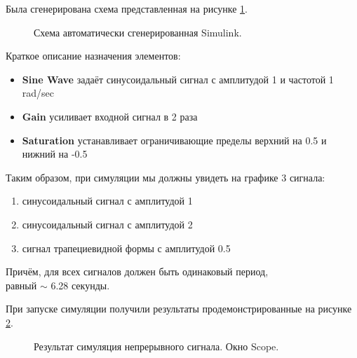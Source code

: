 \documentclass[a4paper,14pt]{extarticle}
\begin{document}
Была сгенерирована схема представленная на рисунке \ref{001}.

\begin{figure}[H]
\caption{Схема автоматически сгенерированная Simulink.}
\label{001}
\end{figure}

Краткое описание назначения элементов:
\begin{itemize}
\item \textbf{Sine Wave} задаёт синусоидальный сигнал с амплитудой 1 и частотой 1 rad/sec
\item \textbf{Gain} усиливает входной сигнал в 2 раза
\item \textbf{Saturation} устанавливает ограничивающие пределы верхний на 0.5 и нижний на -0.5\\
\end{itemize}

Таким образом, при симуляции мы должны увидеть на графике 3 сигнала:
\begin{enumerate}
\item синусоидальный сигнал с амплитудой 1
\item синусоидальный сигнал с амплитудой 2
\item сигнал трапециевидной формы с амплитудой 0.5
\end{enumerate}

Причём, для всех сигналов должен быть одинаковый период,\\ равный 
$\sim$ 6.28 секунды.\\

\newpage

При запуске симуляции получили результаты продемонстрированные на рисунке \ref{002}.

\begin{figure}[H]
\caption{Результат симуляция непрерывного сигнала. Окно Scope.}
\label{002}
\end{figure}
\end{document}
